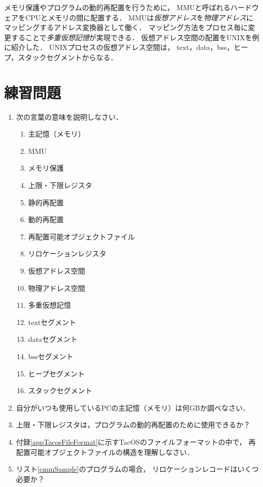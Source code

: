メモリ保護やプログラムの動的再配置を行うために，
MMUと呼ばれるハードウェアをCPUとメモリの間に配置する．
MMUは\emph{仮想アドレス}を\emph{物理アドレス}に
マッピングするアドレス変換器として働く．
マッピング方法をプロセス毎に変更することで\emph{多重仮想記憶}が実現できる．
仮想アドレス空間の配置をUNIXを例に紹介した．
UNIXプロセスの仮想アドレス空間は，
text，data，bss，ヒープ，スタックセグメントからなる．

\section*{練習問題}
\begin{enumerate}
  \renewcommand{\labelenumi}{\ttfamily\arabic{chapter}.\arabic{enumi}}
  \setlength{\leftskip}{1em}
\item 次の言葉の意味を説明しなさい．
  \begin{enumerate}
  \item 主記憶（メモリ）
  \item MMU
  \item メモリ保護
  \item 上限・下限レジスタ
  \item 静的再配置
  \item 動的再配置
  \item 再配置可能オブジェクトファイル
  \item リロケーションレジスタ
  \item 仮想アドレス空間
  \item 物理アドレス空間
  \item 多重仮想記憶
  \item textセグメント
  \item dataセグメント
  \item bssセグメント
  \item ヒープセグメント
  \item スタックセグメント
  \end{enumerate}
\item 自分がいつも使用しているPCの主記憶（メモリ）は何GBか調べなさい．
\item 上限・下限レジスタは，プログラムの動的再配置のために使用できるか？
\item 付録\ref{appTacosFileFormat}に示すTacOSのファイルフォーマットの中で，
  再配置可能オブジェクトファイルの構造を理解しなさい．
\item リスト\ref{cmmSample}のプログラムの場合，
  リロケーションレコードはいくつ必要か？
\end{enumerate}
